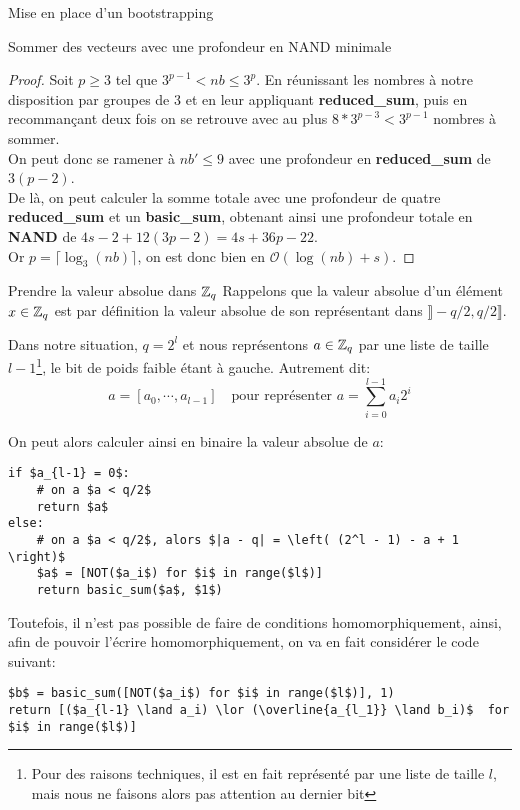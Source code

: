 \begin{section}{Mise en place d'un bootstrapping}
\begin{subsection}{Sommer des vecteurs avec une profondeur en NAND minimale}
\begin{proof}
Soit $p \geqslant 3$ tel que $3^{p-1} < nb \leqslant 3^{p}$.
En réunissant les nombres à notre disposition par groupes de 3 et en leur appliquant \textbf{reduced\_sum}, puis en recommançant deux fois on se retrouve avec au plus $8 * 3^{p-3} < 3^{p-1}$ nombres à sommer. \\
On peut donc se ramener à $nb' \leqslant 9$ avec une profondeur en \textbf{reduced\_sum} de $3(p - 2)$. \\
De là, on peut calculer la somme totale avec une profondeur de quatre
	\textbf{reduced\_sum} et un \textbf{basic\_sum}, obtenant ainsi une
	profondeur totale en \textbf{NAND} de $4 s - 2 + 12(3p - 2) = 4s + 36p -22$. \\
Or $p = \lceil \log_3(nb) \rceil$, on est donc bien en $\mathcal{O}(\log(nb) +
	s)$.
\end{proof}

\end{subsection}
\begin{subsection}{Prendre la valeur absolue dans $\mathbb{Z}_q$}
	Rappelons que la valeur absolue d'un élément $x\in \mathbb{Z}_q$ est par
	définition la valeur absolue de son représentant dans $\rrbracket -q/2,
	q/2\rrbracket$. 
	
	Dans notre situation, $q = 2^l$ et nous représentons $a\in \mathbb{Z}_q$ par une liste de
	taille $l-1$\footnote{Pour des raisons techniques, il est en fait
	représenté par une liste de taille $l$, mais nous ne faisons alors pas
	attention au dernier bit}, le bit de poids faible étant à gauche.
	Autrement dit:
\[ a = [a_0, \cdots, a_{l-1}] \quad \text{pour représenter } a = \sum_{i=0}^{l-1} a_i 2^i\]

	On peut alors calculer ainsi en binaire la valeur absolue de $a$:

\vspace{0.5cm}
\begin{lstlisting}
if $a_{l-1} = 0$: 
	# on a $a < q/2$
	return $a$
else:
	# on a $a < q/2$, alors $|a - q| = \left( (2^l - 1) - a + 1 \right)$
	$a$ = [NOT($a_i$) for $i$ in range($l$)]
	return basic_sum($a$, $1$)
\end{lstlisting}

Toutefois, il n'est pas possible de faire de conditions homomorphiquement,
ainsi, afin de pouvoir l'écrire homomorphiquement, on va en fait considérer 
le code suivant:

\vspace{0.5cm}
\begin{lstlisting}
$b$ = basic_sum([NOT($a_i$) for $i$ in range($l$)], 1)
return [($a_{l-1} \land a_i) \lor (\overline{a_{l_1}} \land b_i)$  for $i$ in range($l$)]
\end{lstlisting}


\end{subsection}
\end{section}
